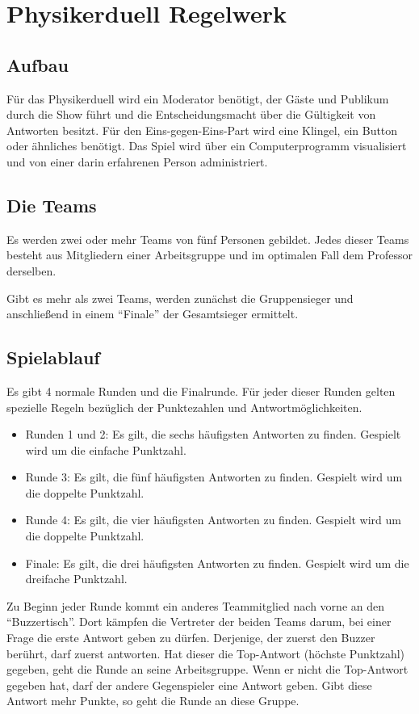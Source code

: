 \documentclass{scrartcl}
\begin{document}
\section*{Physikerduell Regelwerk}

\subsection*{Aufbau}
Für das Physikerduell wird ein Moderator benötigt, der Gäste und Publikum durch die Show führt und die Entscheidungsmacht über die Gültigkeit von Antworten besitzt. Für den Eins-gegen-Eins-Part wird eine Klingel, ein Button oder ähnliches benötigt. Das Spiel wird über ein Computerprogramm visualisiert und von einer darin erfahrenen Person administriert.

\subsection*{Die Teams}
Es werden zwei oder mehr Teams von fünf Personen gebildet. Jedes dieser Teams besteht aus Mitgliedern einer Arbeitsgruppe und im optimalen Fall dem Professor derselben.

Gibt es mehr als zwei Teams, werden zunächst die Gruppensieger und anschließend in einem "`Finale"' der Gesamtsieger ermittelt.

\subsection*{Spielablauf}
Es gibt 4 normale Runden und die Finalrunde. Für jeder dieser Runden gelten spezielle Regeln bezüglich der Punktezahlen und Antwortmöglichkeiten.
\begin{itemize}
\item Runden 1 und 2: Es gilt, die sechs häufigsten Antworten zu finden. Gespielt wird um die einfache Punktzahl.
\item Runde 3: Es gilt, die fünf häufigsten Antworten zu finden. Gespielt wird um die doppelte Punktzahl.
\item Runde 4: Es gilt, die vier häufigsten Antworten zu finden. Gespielt wird um die doppelte Punktzahl.
\item Finale: Es gilt, die drei häufigsten Antworten zu finden. Gespielt wird um die dreifache Punktzahl.
\end{itemize}
Zu Beginn jeder Runde kommt ein anderes Teammitglied nach vorne an den "`Buzzertisch"'. Dort kämpfen die Vertreter der beiden Teams darum, bei einer Frage die erste Antwort geben zu dürfen. Derjenige, der zuerst den Buzzer berührt, darf zuerst antworten. Hat dieser die Top-Antwort (höchste Punktzahl) gegeben, geht die Runde an seine Arbeitsgruppe. Wenn er nicht die Top-Antwort gegeben hat, darf der andere Gegenspieler eine Antwort geben. Gibt diese Antwort mehr Punkte, so geht die Runde an diese Gruppe.
\end{document}
